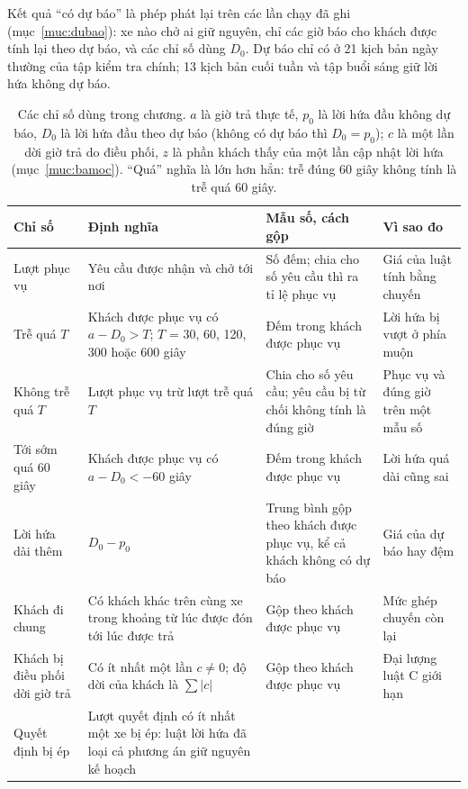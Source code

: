 Kết quả ``có dự báo'' là phép phát lại trên các lần chạy đã ghi (mục~\ref{muc:dubao}): xe nào chở ai giữ nguyên, chỉ
các giờ báo cho khách được tính lại theo dự báo, và các chỉ số dùng $D_0$. Dự báo chỉ có ở 21 kịch bản ngày thường của
tập kiểm tra chính; 13 kịch bản cuối tuần và tập buổi sáng giữ lời hứa không dự báo.

\begin{table}[htbp]
\centering
\caption{Các chỉ số dùng trong chương. $a$ là giờ trả thực tế, $p_0$ là lời hứa đầu không dự báo, $D_0$
là lời hứa đầu theo dự báo (không có dự báo thì $D_0 = p_0$); $c$ là một lần dời giờ trả do điều phối, $z$ là phần
khách thấy của một lần cập nhật lời hứa (mục~\ref{muc:bamoc}). ``Quá'' nghĩa là lớn hơn hẳn: trễ đúng 60 giây
không tính là trễ quá 60 giây.}
\label{bang:c4-chiso}
\footnotesize
\setlength{\tabcolsep}{3pt}
\begin{tabular}{@{}p{2.7cm}p{5.3cm}p{3.5cm}p{3.5cm}@{}}
\toprule
\textbf{Chỉ số} & \textbf{Định nghĩa} & \textbf{Mẫu số, cách gộp} & \textbf{Vì sao đo}\\
\midrule
Lượt phục vụ & Yêu cầu được nhận và chở tới nơi & Số đếm; chia cho số yêu cầu thì ra tỉ lệ phục vụ & Giá của
luật tính bằng chuyến\\
Trễ quá $T$ & Khách được phục vụ có $a - D_0 > T$; $T$ = 30, 60, 120, 300 hoặc 600 giây & Đếm trong khách
được phục vụ & Lời hứa bị vượt ở phía muộn\\
Không trễ quá $T$ & Lượt phục vụ trừ lượt trễ quá $T$ & Chia cho số yêu cầu; yêu cầu bị từ chối không
tính là đúng giờ & Phục vụ và đúng giờ trên một mẫu số\\
Tới sớm quá 60 giây & Khách được phục vụ có $a - D_0 < -60$ giây & Đếm trong khách được phục vụ & Lời
hứa quá dài cũng sai\\
Lời hứa dài thêm & $D_0 - p_0$ & Trung bình gộp theo khách được phục vụ, kể cả khách không có dự báo & Giá của
dự báo hay đệm\\
Khách đi chung & Có khách khác trên cùng xe trong khoảng từ lúc được đón tới lúc được trả & Gộp theo
khách được phục vụ & Mức ghép chuyến còn lại\\
Khách bị điều phối dời giờ trả & Có ít nhất một lần $c \neq 0$; độ dời của khách là $\sum|c|$ &
Gộp theo khách được phục vụ & Đại lượng luật C giới hạn\\
Quyết định bị ép & Lượt quyết định có ít nhất một xe bị ép: luật lời hứa đã loại cả phương án giữ nguyên kế hoạch

\end{tabular}
\end{table}
